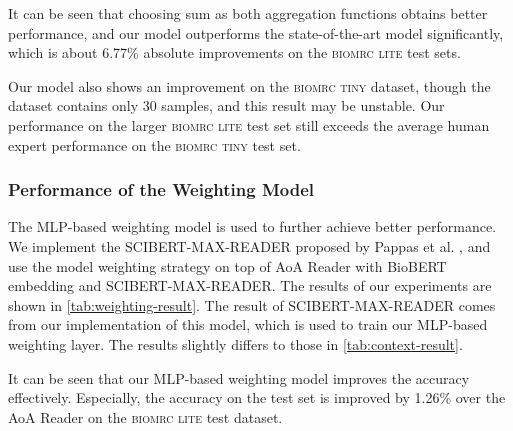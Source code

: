 \documentclass[sigconf, screen]{acmart}
\newcommand{\biomrclite}{{\scshape{biomrc lite}}\xspace}
\newcommand{\biomrctiny}{{\scshape{biomrc tiny}}\xspace}
\newcommand{\biobert}{Bio\-BERT\xspace}
\newcommand{\aoa}{AoA Reader\xspace}
\begin{document}
It can be seen that choosing sum as both aggregation functions obtains better performance, and our model outperforms the state-of-the-art model significantly, which is about 6.77\% absolute improvements on the \biomrclite test sets.

Our model also shows an improvement on the \biomrctiny dataset, though the dataset contains only 30 samples, and this result may be unstable. Our performance on the larger \biomrclite test set still exceeds the average human expert performance on the \biomrctiny test set.

\subsubsection{Performance of the Weighting Model}

The MLP-based weighting model is used to further achieve better performance. We implement the SCIBERT-MAX-READER proposed by Pappas et al. \cite{pappasBioMRCDatasetBiomedical2020}, and use the model weighting strategy on top of \aoa with \biobert embedding and SCIBERT-MAX-READER. The results of our experiments are shown in \cref{tab:weighting-result}. The result of SCIBERT-MAX-READER comes from our implementation of this model, which is used to train our MLP-based weighting layer. The results slightly differs to those in \cref{tab:context-result}.

It can be seen that our MLP-based weighting model improves the accuracy effectively. Especially, the accuracy on the test set is improved by 1.26\% over the \aoa on the \biomrclite test dataset.
\end{document}
